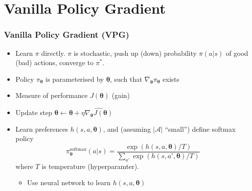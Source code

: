 \documentclass[10pt,a4paper, handout]{beamer}
\newcommand{\bth}{{\boldsymbol{\theta}}}
\begin{document}
\section{Vanilla Policy Gradient}
\begin{frame}
	\frametitle{Vanilla Policy Gradient (VPG)}
	\begin{itemize}
		\item Learn $\pi$ directly. $\pi$ is stochastic, push up (down) probability $\pi(a|s)$
		of good (bad) actions, converge to $\pi^*$.
		\pause
		\item Policy $\pi_\bth$ is parameterised by $\bth$, such that $\nabla_\bth \pi_\bth$ exists
		\pause
		\item Measure of performance $J(\bth)$ (gain)
		\pause
		\item Update step $\bth \leftarrow \bth + \eta \widehat{\nabla_{\bth} J(\bth)}$ 
		\pause
			\item Learn preferences $h(s,a, \bth)$, and (assuming $|\mathcal{A}|$ ``small'')
			define softmax policy
			$$
			\pi^{\text{softmax}}_\bth(a|s) = \frac{\exp(h(s,a,\bth)/T)}{\sum_{a'} \exp(h(s,a',\bth)/T)}
			$$ 
			where $T$ is temperature (hyperparamter).
			\begin{itemize}
					\item Use neural network to learn $h(s,a,\bth)$
				\end{itemize}
	\end{itemize}
\end{frame}
%
\end{document}
